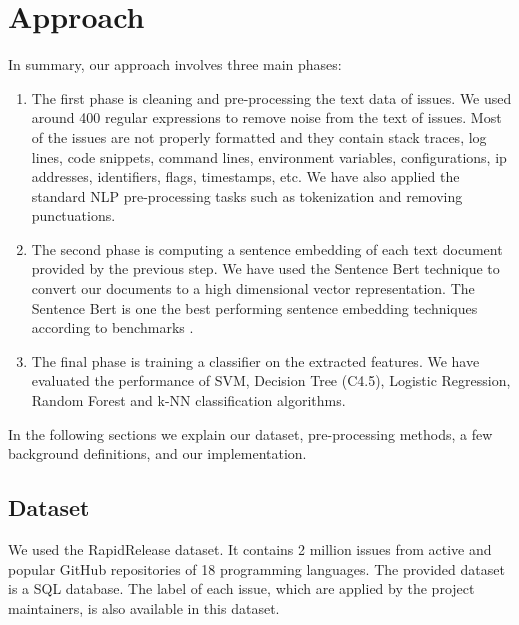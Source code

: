 \documentclass[conference]{IEEEtran}
\begin{document}
\section{Approach}\label{approach}
In summary, our approach involves three main phases:
\begin{enumerate}
  \item The first phase is cleaning and pre-processing the text data of issues. 
  We used around 400 regular expressions to remove noise from the text of issues. 
  Most of the issues are not properly formatted and they contain stack traces, log lines, code snippets, 
  command lines, environment variables, configurations, ip addresses, identifiers, flags, timestamps, etc.
  We have also applied the standard NLP pre-processing tasks such as tokenization and removing punctuations.
  \item The second phase is computing a sentence embedding of each text document provided by 
  the previous step. We have used the Sentence Bert \cite{reimers-2019-sentence-bert} technique to convert our
  documents to a high dimensional vector representation. The Sentence Bert is one the 
  best performing sentence embedding techniques according to benchmarks \cite{reimers-2019-sentence-bert}.
  \item The final phase is training a classifier on the extracted features. We have evaluated
  the performance of SVM, Decision Tree (C4.5), Logistic Regression, Random Forest and k-NN 
  classification algorithms.
\end{enumerate}

In the following sections we explain our dataset, pre-processing methods, a few background definitions, and
our implementation.

\subsection{Dataset}
We used the RapidRelease \cite{8816794} dataset. It contains 2 million issues from active and popular 
GitHub repositories of 18 programming languages. The provided dataset is a SQL database.
The label of each issue, which are applied by the project maintainers, is also available in this dataset.
\end{document}
